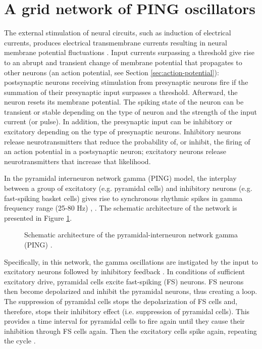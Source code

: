 \section{A grid network of PING oscillators}

The external stimulation of neural circuits, such as induction of electrical currents, produces electrical transmembrane currents resulting in neural membrane potential fluctuations \cite{IzhikevichBook2004:2}. Input currents surpassing a threshold give rise to an abrupt and transient change of membrane potential that propagates to other neurons (an action potential, see Section \ref{sec:action-potential}): postsynaptic neurons receiving stimulation from presynaptic neurons fire if the summation of their presynaptic input surpasses a threshold. Afterward, the neuron resets its membrane potential. The spiking state of the neuron can be transient or stable depending on the type of neuron and the strength of the input current (or pulse). In addition, the presynaptic input can be inhibitory or excitatory depending on the type of presynaptic neurons. Inhibitory neurons release neurotransmitters that reduce the probability of, or inhibit, the firing of an action potential in a postsynaptic neuron; excitatory neurons release neurotransmitters that increase that likelihood. 

In the pyramidal interneuron network gamma (PING) model, the interplay between a group of  excitatory (e.g. pyramidal cells) and inhibitory neurons (e.g. fast-spiking basket cells) gives rise to synchronous rhythmic spikes in gamma frequency range (25-80 Hz)  \cite{Whittington2000}, \cite{Borgers2003}. The schematic architecture of the network is presented in Figure \ref{fig:single-ping}.

\begin{figure}[!htp]
    \centering
    
    \caption[Schematic architecture of PING]{Schematic architecture of the pyramidal-interneuron network gamma (PING) \cite{Lowet2015}.}
    \label{fig:single-ping}
\end{figure}

Specifically, in this network, the gamma oscillations are instigated by the input to excitatory neurons followed by inhibitory feedback \cite{Whittington2000}. In conditions of sufficient excitatory drive, pyramidal cells excite fast-spiking (FS) neurons. FS neurons then become depolarized and inhibit the pyramidal neurons, thus creating a loop. The suppression of pyramidal cells stops the depolarization of FS cells and, therefore, stops their inhibitory effect (i.e. suppression of pyramidal cells). This provides a time interval for pyramidal cells to fire again until they cause their inhibition through FS cells again. Then the excitatory cells spike again, repeating the cycle \cite{Kopell2011}.

